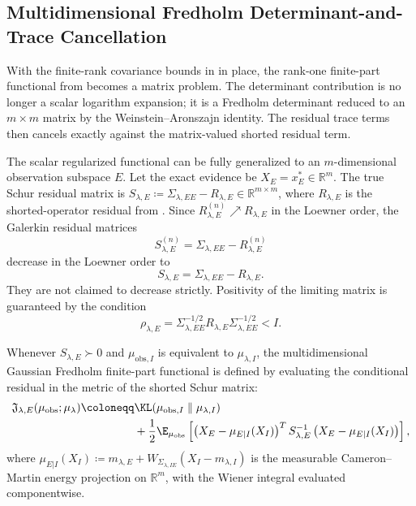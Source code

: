 \subsection{Multidimensional Fredholm Determinant-and-Trace Cancellation}
\label{sec:discussion:multidim_functional}

With the finite-rank covariance bounds in
 in
place, the rank-one finite-part functional from 
becomes a matrix problem.  The determinant contribution is no longer a scalar
logarithm expansion; it is a Fredholm determinant reduced to an
$m\times m$ matrix by the Weinstein--Aronszajn identity.  The residual trace terms
then cancels exactly against the matrix-valued shorted residual term.

The scalar regularized functional can be fully generalized to an $m$-dimensional observation subspace $E$. Let the exact evidence be $X_E = x_E^* \in \mathbb{R}^m$. The true Schur residual matrix is $S_{\lambda,E} \coloneqq \Sigma_{\lambda,EE} - R_{\lambda,E} \in \mathbb{R}^{m \times m}$, where $R_{\lambda,E}$ is the shorted-operator residual from . Since $R_{\lambda,E}^{(n)}\nearrow R_{\lambda,E}$ in the Loewner order, the Galerkin residual matrices
\[
S_{\lambda,E}^{(n)}
=
\Sigma_{\lambda,EE}-R_{\lambda,E}^{(n)}
\]
decrease in the Loewner order to
\[
S_{\lambda,E}
=
\Sigma_{\lambda,EE}-R_{\lambda,E}.
\]
They are not claimed to decrease strictly.  Positivity of the limiting
matrix is guaranteed by the condition
\[
\rho_{\lambda,E}
=
\Sigma_{\lambda,EE}^{-1/2}
R_{\lambda,E}
\Sigma_{\lambda,EE}^{-1/2}
<I.
\]

\begin{definition}
  \label{def:multidim_unified_action}
  Whenever $S_{\lambda,E} \succ 0$ and $\mu_{\text{obs},I}$ is equivalent to $\mu_{\lambda,I}$, the multidimensional Gaussian Fredholm finite-part functional is defined by evaluating the conditional residual in the metric of the shorted Schur matrix:
  \begin{equation}
    \label{eq:multidim_unified_action}
    \begin{aligned}
      \mathfrak{J}_{\lambda,E}(\mu_{\mathrm{obs}}; \mu_\lambda) \coloneqq &\KL(\mu_{\mathrm{obs},I} \parallel \mu_{\lambda,I}) \\
      &+ \frac{1}{2} \E_{\mu_{\mathrm{obs}}}\left[ \left( X_E - \mu_{E|I}(X_I) \right)^T S_{\lambda,E}^{-1} \left( X_E - \mu_{E|I}(X_I) \right) \right],
    \end{aligned}
  \end{equation}
  where $\mu_{E|I}(X_I) \coloneqq m_{\lambda,E} + W_{\Sigma_{\lambda,IE}}(X_I - m_{\lambda,I})$ is the measurable Cameron--Martin energy projection on $\mathbb{R}^m$, with the Wiener integral evaluated componentwise.
\end{definition}


